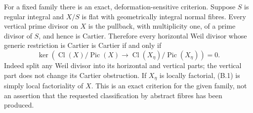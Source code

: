 For a fixed family there is an exact, deformation-sensitive criterion. Suppose
$S$ is regular integral and $X/S$ is flat with geometrically integral normal
fibres. Every vertical prime divisor on $X$ is the pullback, with multiplicity
one, of a prime divisor of $S$, and hence is Cartier. Therefore every horizontal
Weil divisor whose generic restriction is Cartier is Cartier if and only if
\[
 \ker\left(\operatorname{Cl}(X)/\operatorname{Pic}(X)
 \longrightarrow \operatorname{Cl}(X_\eta)/\operatorname{Pic}(X_\eta)\right)=0.
\tag{B.1}
\]
Indeed split any Weil divisor into its horizontal and vertical parts; the
vertical part does not change its Cartier obstruction. If $X_\eta$ is locally
factorial, (B.1) is simply local factoriality of $X$. This is an exact criterion
for the given family, not an assertion that the requested classification by
abstract fibres has been produced.

